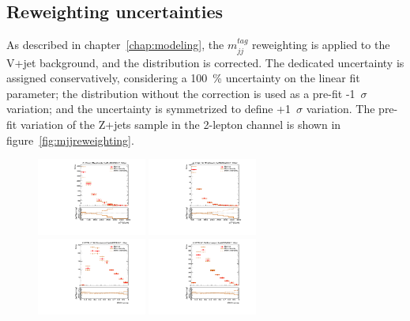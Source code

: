 \subsection{Reweighting uncertainties}
As described in chapter~\ref{chap:modeling}, the $m^{tag}_{jj}$ reweighting is applied to the V+jet background, and the distribution is corrected. 
The dedicated uncertainty is assigned conservatively, considering a 100~\% uncertainty on the linear fit parameter; the distribution without the correction is used as a pre-fit -1~$\sigma$ variation; and the uncertainty is symmetrized to define +1~$\sigma$ variation. 
The pre-fit variation of the Z+jets sample in the 2-lepton channel is shown in figure~\ref{fig:mjjreweighting}.
\begin{figure}[H]
\begin{center}
 \includegraphics[width=0.32\textwidth,keepaspectratio]{figures/syst/Z_0ptag1pfat0pjet_0ptv_CRVjet_MTagMerJets_SysMJJREWEIGHT_100per.pdf}
 \includegraphics[width=0.32\textwidth,keepaspectratio]{figures/syst/Z_0ptag2pjet_0ptv_CRVjet_Fid_MTagResJets_SysMJJREWEIGHT_100per.pdf}
 \\
 \includegraphics[width=0.32\textwidth,keepaspectratio]{figures/syst/Z_0ptag1pfat0pjet_0ptv_SRVBS_HP_RNNScoreMerged_SysMJJREWEIGHT_100per.pdf}
 \includegraphics[width=0.32\textwidth,keepaspectratio]{figures/syst/Z_0ptag1pfat0pjet_0ptv_SRVBS_LP_RNNScoreMerged_SysMJJREWEIGHT_100per.pdf}

\end{center}
\end{figure}
